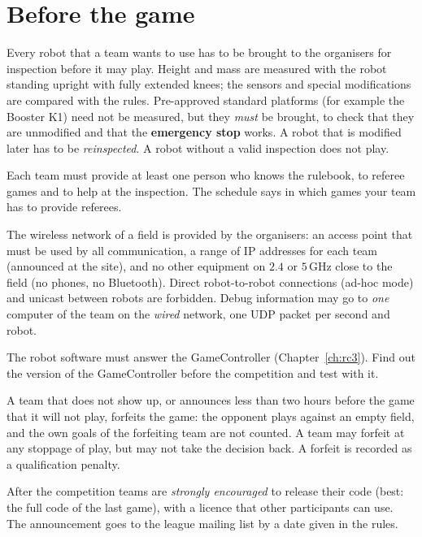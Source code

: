 \section*{Before the game}
\begin{description}[leftmargin=0.6cm]
 \item[Robot inspection.] Every robot that a team wants to use has to be brought to the organisers for inspection before it may play. Height and mass are measured with the robot standing upright with fully extended knees; the sensors and special modifications are compared with the rules. Pre-approved standard platforms (for example the Booster K1) need not be measured, but they \emph{must} be brought, to check that they are unmodified and that the \textbf{emergency stop} works. A robot that is modified later has to be \emph{reinspected}. A robot without a valid inspection does not play.
 \item[Referees.] Each team must provide at least one person who knows the rulebook, to referee games and to help at the inspection. The schedule says in which games your team has to provide referees.
 \item[Network.] The wireless network of a field is provided by the organisers: an access point that must be used by all communication, a range of IP addresses for each team (announced at the site), and no other equipment on $2.4$ or $5$\,GHz close to the field (no phones, no Bluetooth). Direct robot-to-robot connections (ad-hoc mode) and unicast between robots are forbidden. Debug information may go to \emph{one} computer of the team on the \emph{wired} network, one UDP packet per second and robot.
 \item[GameController.] The robot software must answer the GameController (Chapter~\ref{ch:rc3}). Find out the version of the GameController before the competition and test with it.
 \item[Forfeit.] A team that does not show up, or announces less than two hours before the game that it will not play, forfeits the game: the opponent plays against an empty field, and the own goals of the forfeiting team are not counted. A team may forfeit at any stoppage of play, but may not take the decision back. A forfeit is recorded as a qualification penalty.
 \item[Code release.] After the competition teams are \emph{strongly encouraged} to release their code (best: the full code of the last game), with a licence that other participants can use. The announcement goes to the league mailing list by a date given in the rules.
\end{description}

